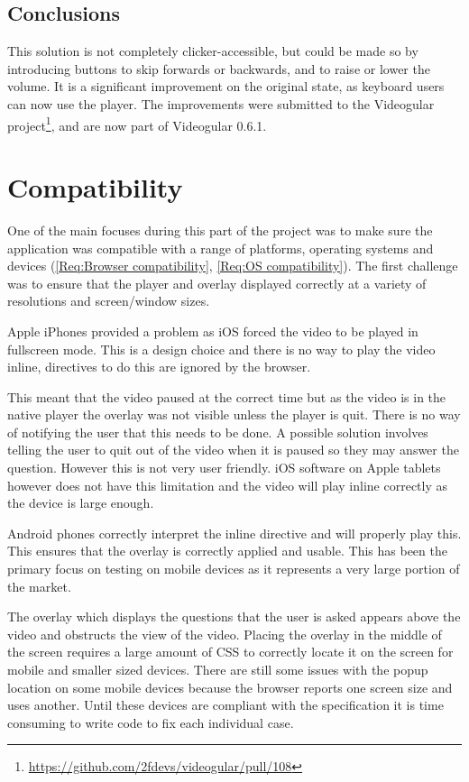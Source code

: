 \subsection{Conclusions}

This solution is not completely clicker-accessible, but could be made so by introducing buttons to skip forwards or backwards, and to raise or lower the volume. It is a significant improvement on the original state, as keyboard users can now use the player. The improvements were submitted to the \gls{Videogular} project\footnote{\url{https://github.com/2fdevs/videogular/pull/108}}, and are now part of \gls{Videogular} 0.6.1.

\section{Compatibility}
\label{Section:Compatibility}

One of the main focuses during this part of the project was to make sure the application was compatible with a range of platforms, operating systems and devices (\cref{Req:Browser compatibility}, \cref{Req:OS compatibility}). The first challenge was to ensure that the player and overlay displayed correctly at a variety of resolutions and screen/window sizes.

Apple iPhones provided a problem as iOS forced the video to be played in fullscreen mode. This is a design choice and there is no way to play the video inline, directives to do this are ignored by the browser.

This meant that the video paused at the correct time but as the video is in the native player the overlay was not visible unless the player is quit. There is no way of notifying the user that this needs to be done. A possible solution involves telling the user to quit out of the video when it is paused so they may answer the question. However this is not very user friendly. iOS software on Apple tablets however does not have this limitation and the video will play inline correctly as the device is large enough.

Android phones correctly interpret the inline directive and will properly play this. This ensures that the overlay is correctly applied and usable. This has been the primary focus on testing on mobile devices as it represents a very large portion of the market.

The overlay which displays the questions that the user is asked appears above the video and obstructs the view of the video. Placing the overlay in the middle of the screen requires a large amount of \gls{CSS} to correctly locate it on the screen for mobile and smaller sized devices. There are still some issues with the popup location on some mobile devices because the browser reports one screen size and uses another. Until these devices are compliant with the specification it is time consuming to write code to fix each individual case.

